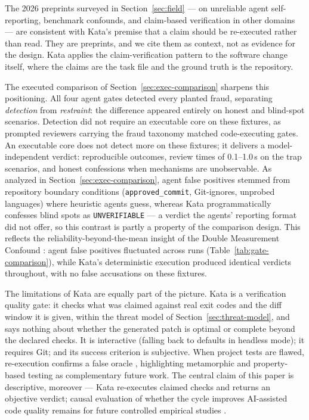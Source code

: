 \documentclass{sbc2019}%
\begin{document}
The 2026 preprints surveyed in Section~\ref{sec:field} --- on unreliable
agent self-reporting, benchmark confounds, and claim-based verification in
other domains --- are consistent with Kata's premise that a claim should be
re-executed rather than read. They are preprints, and we cite them as
context, not as evidence for the design. Kata applies the claim-verification
pattern to the software change itself, where the claims are the task file and
the ground truth is the repository.

The executed comparison of Section~\ref{sec:exec-comparison} sharpens
this positioning. All four agent gates detected every planted fraud, separating
\emph{detection} from \emph{restraint}: the difference appeared entirely on
honest and blind-spot scenarios. Detection did not require an executable core
on these fixtures, as prompted reviewers carrying the fraud taxonomy matched
code-executing gates. An executable core does not detect more on these
fixtures; it delivers a model-independent
verdict: reproducible outcomes, review times of 0.1--1.0\,s on the trap scenarios, and
honest confessions when mechanisms are unobservable. As analyzed in
Section~\ref{sec:exec-comparison}, agent false positives stemmed from
repository boundary conditions (\texttt{approved\_commit}, Git-ignores,
unprobed languages) where heuristic agents guess, whereas Kata programmatically
confesses blind spots as \texttt{UNVERIFIABLE} --- a verdict the agents'
reporting format did not offer, so this contrast is partly a property of the
comparison design. This reflects the
reliability-beyond-the-mean insight of the Double Measurement Confound
\cite{double-measurement}: agent false positives fluctuated across runs
(Table~\ref{tab:gate-comparison}), while Kata's deterministic execution
produced identical verdicts throughout, with no false accusations on these
fixtures.

The limitations of Kata are equally part of the picture. Kata is a
verification quality gate: it checks what was claimed against
real exit codes and the diff window it is given, within the threat model of
Section~\ref{sec:threat-model}, and says nothing about whether the generated
patch is optimal or complete beyond the declared checks. It is
interactive (falling back to defaults in headless mode); it requires Git;
and its success criterion is subjective. When project tests are flawed,
re-execution confirms a false oracle \cite{barr-oracle}, highlighting
metamorphic and property-based testing \cite{chen-metamorphic} as complementary
future work. The central claim of this paper is descriptive, moreover --- Kata
re-executes claimed checks and returns an objective verdict; causal evaluation
of whether the cycle improves AI-assisted code quality remains for future
controlled empirical studies \cite{fable}.
\end{document}
